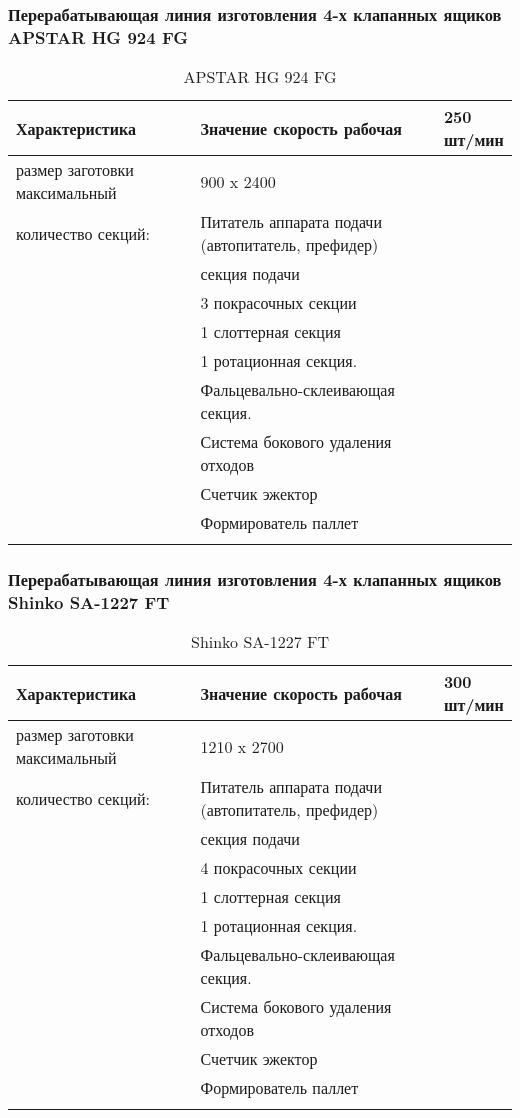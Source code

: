 \subsubsection{Перерабатывающая линия изготовления 4-х клапанных ящиков APSTAR HG 924 FG}
\begin{longtable}{|p{10cm}|p{5cm}|}
    \hline
	\textbf{Характеристика} & \textbf{Значение}
	\endhead
  	\hline 
скорость рабочая                         	& 250 шт/мин\\
  	\hline 
размер заготовки максимальный   & 900 x 2400  \\
  	\hline 
количество секций: 
& Питатель аппарата подачи  (автопитатель, префидер)\\
& секция подачи\\
& 3 покрасочных секции \\
& 1 слоттерная секция\\
& 1 ротационная секция.\\
& Фальцевально-склеивающая секция. \\
& Система бокового удаления отходов\\
& Счетчик эжектор\\
& Формирователь паллет\\
\hline 
  \caption{APSTAR HG 924 FG}\label{tab:line1}
\end{longtable}


\subsubsection{Перерабатывающая линия изготовления 4-х клапанных ящиков Shinko SA-1227 FT}
\begin{longtable}{|p{10cm}|p{5cm}|}
    \hline
	\textbf{Характеристика} & \textbf{Значение}
	\endhead
  	\hline 
скорость рабочая                         	& 300 шт/мин\\
  	\hline 
размер заготовки максимальный   & 1210 x 2700  \\
  	\hline 
количество секций: 
& Питатель аппарата подачи  (автопитатель, префидер)\\
& секция подачи\\
& 4 покрасочных секции \\
& 1 слоттерная секция\\
& 1 ротационная секция.\\
& Фальцевально-склеивающая секция. \\
& Система бокового удаления отходов\\
& Счетчик эжектор\\
& Формирователь паллет\\
\hline 
  \caption{Shinko SA-1227 FT}\label{tab:line1}
\end{longtable}

